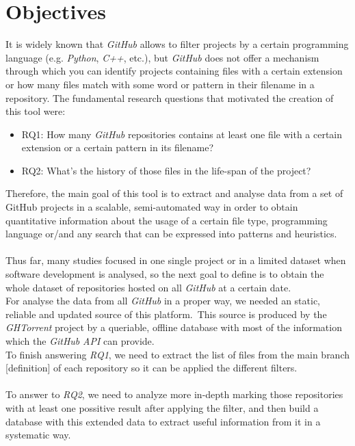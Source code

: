 \documentclass[a4paper, 12pt]{book}
\begin{document}
\chapter{Objectives}
\label{chap:objetivos}
It is widely known that \emph{GitHub} allows to filter projects by a certain programming language (e.g.
\emph{Python}, \emph{C++}, etc.), but \emph{GitHub} does not offer a mechanism through which you can identify projects
containing files with a certain extension or how many files match with some word or pattern in their
filename in a repository. The fundamental research questions that motivated the creation of this tool were:
\begin{itemize}
  \item RQ1: How many \emph{GitHub} repositories contains at least one file with a certain extension or a certain
        pattern in its filename?
  \item RQ2: What's the history of those files in the life-span of the project?
\end{itemize}
Therefore, the main goal of this tool is to extract and analyse data from a set of GitHub projects in a scalable,
semi-automated way in order to obtain quantitative information about the usage of a certain file type, programming language
or/and any search that can be expressed into patterns and heuristics.\\\\
Thus far, many studies focused in one single project or in a limited dataset when software development is analysed, so
the next goal to define is to obtain the whole dataset of repositories hosted on all \emph{GitHub} at a certain date.\\
For analyse the data from all \emph{GitHub} in a proper way, we needed an static, reliable and updated source of this platform.\
This source is produced by the \emph{GHTorrent} project by a queriable, offline database with most of the information which the
\emph{GitHub} \textit{API} can provide.\\
To finish answering \emph{RQ1}, we need to extract the list of files from the main branch [definition] of each repository so
it can be applied the different filters.\\\\
To answer to \emph{RQ2}, we need to analyze more in-depth marking those repositories with at least one possitive result
after applying the filter, and then build a database with this extended data to extract useful information from it in a
systematic way.
\cleardoublepage
\end{document}
